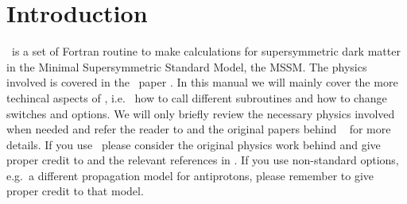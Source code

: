 \chapter{Introduction}

\ds\ is a set of Fortran routine to make calculations for
supersymmetric dark matter in the Minimal Supersymmetric Standard
Model, the MSSM. The physics involved is covered in the \ds\ paper
\cite{dspaper}. In this manual we will mainly cover the more techincal
aspects of \ds, i.e.~ how to call different subroutines and how to
change switches and options. We will only briefly review the necessary
physics involved when needed and refer the reader to \cite{dspaper}
and the original papers behind \ds\ \cite{dsoriginal} for more
details. If you use \ds\, please consider the original physics work
behind and give proper credit to \cite{dspaper} and the relevant
references in \cite{dsoriginal}. If you use non-standard options,
e.g.\ a different propagation model for antiprotons, please remember
to give proper credit to that model.

